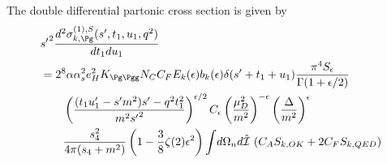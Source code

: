 The double differential partonic cross section is given by
\begin{align}
&{s'}^2\frac{d^2\sigma_{k,\Pg}^{(1),S}(s',t_1,u_1,q^2)}{dt_1du_1} \nonumber\\
 &= 2^8\alpha\alpha_s^2 e_H^2 K_{\Pg\Pgg}N_CC_F E_k(\epsilon) b_k(\epsilon)\delta(s'+t_1+u_1)\frac{\pi^4 S_\epsilon}{\Gamma(1+\epsilon/2)} \nonumber\\
 &\hspace{20pt} \left(\frac{(t_1u_1'-s'm^2)s' - q^2t_1^2}{m^2{s'}^2}\right)^{\epsilon/2} C_\epsilon \left(\frac{\mu_D^2}{m^2}\right)^{-\epsilon} \left(\frac \Delta {m^2}\right)^\epsilon \nonumber\\
 &\hspace{20pt}\frac{s_4^2}{4\pi(s_4+m^2)}\left(1-\frac 3 8 \zeta(2)\epsilon^2\right)\int\!d\Omega_n d\hat{\mathcal I}\,\left(C_A S_{k,OK} + 2C_F S_{k,QED}\right)
\end{align}
